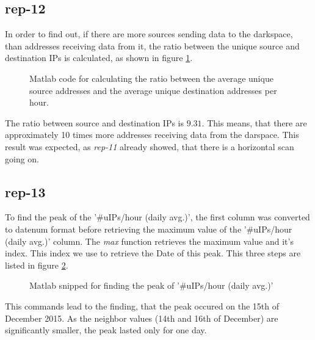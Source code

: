 \subsection*{rep-12}
In order to find out, if there are more sources sending data to the darkspace, than addresses receiving data from it, the ratio between the unique source and destination IPs is calculated, as shown in figure \ref{fig:ratio_source_destination_ip}.

\begin{figure}[H]

\caption{Matlab code for calculating the ratio between the average unique source addresses and the average unique destination addresses per hour.}
\label{fig:ratio_source_destination_ip}
\end{figure}

The ratio between source and destination IPs is $9.31$. This means, that there are approximately 10 times more addresses receiving data from the darspace. This result was expected, as \textit{rep-11} already showed, that there is a horizontal scan going on.

\subsection*{rep-13}
To find the peak of the '\#uIPs/hour (daily avg.)', the first column was converted to datenum format before retrieving the maximum value of the '\#uIPs/hour (daily avg.)' column. The \textit{max} function retrieves the maximum value and it's index. This index we use to retrieve the Date of this peak. This three steps are listed in figure \ref{fig:find_peak}.

\begin{figure}[H]

\caption{Matlab snipped for finding the peak of '\#uIPs/hour (daily avg.)'}
\label{fig:find_peak}
\end{figure}

This commands lead to the finding, that the peak occured on the 15th of December 2015. As the neighbor values (14th and 16th of December) are significantly smaller, the peak lasted only for one day.

